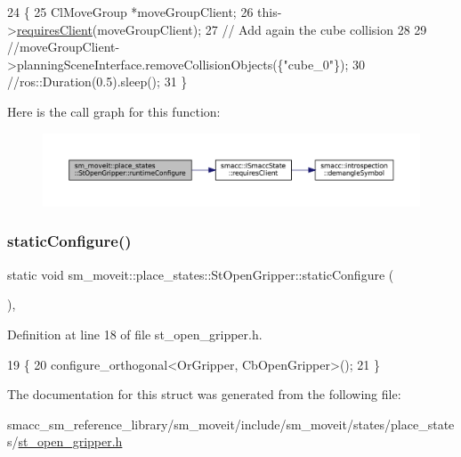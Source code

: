 \begin{DoxyCode}
24     \{
25         ClMoveGroup *moveGroupClient;
26         this->\hyperlink{classsmacc_1_1ISmaccState_a7f95c9f0a6ea2d6f18d1aec0519de4ac}{requiresClient}(moveGroupClient);
27         \textcolor{comment}{// Add again the cube collision}
28 
29         \textcolor{comment}{//moveGroupClient->planningSceneInterface.removeCollisionObjects(\{"cube\_0"\});}
30         \textcolor{comment}{//ros::Duration(0.5).sleep();}
31     \}
\end{DoxyCode}
Here is the call graph for this function\+:
\nopagebreak
\begin{figure}[H]
\begin{center}
\leavevmode
\includegraphics[width=350pt]{structsm__moveit_1_1place__states_1_1StOpenGripper_a49b45992f2ff9a5f1435b14eab1f2621_cgraph}
\end{center}
\end{figure}
\mbox{\label{structsm__moveit_1_1place__states_1_1StOpenGripper_a3a7ab2224ad0ca4c1e88d8432b0f37bf}} 
\subsubsection{\texorpdfstring{static\+Configure()}{staticConfigure()}}
{\footnotesize\ttfamily static void sm\+\_\+moveit\+::place\+\_\+states\+::\+St\+Open\+Gripper\+::static\+Configure (\begin{DoxyParamCaption}{ }\end{DoxyParamCaption})\hspace{0.3cm}{\ttfamily [inline]}, {\ttfamily [static]}}



Definition at line 18 of file st\+\_\+open\+\_\+gripper.\+h.


\begin{DoxyCode}
19     \{
20         configure\_orthogonal<OrGripper, CbOpenGripper>();
21     \}
\end{DoxyCode}


The documentation for this struct was generated from the following file\+:\begin{DoxyCompactItemize}
\item 
smacc\+\_\+sm\+\_\+reference\+\_\+library/sm\+\_\+moveit/include/sm\+\_\+moveit/states/place\+\_\+states/\hyperlink{include_2sm__moveit_2states_2place__states_2st__open__gripper_8h}{st\+\_\+open\+\_\+gripper.\+h}\end{DoxyCompactItemize}
